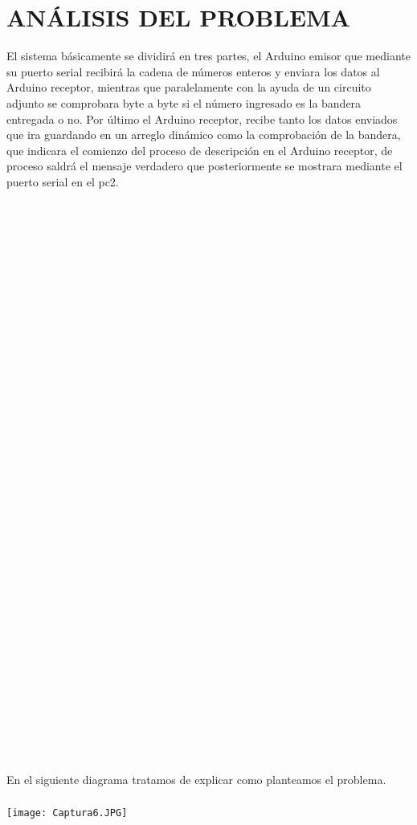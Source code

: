 \documentclass{article}
\begin{document}
\newpage
\section{ANÁLISIS DEL PROBLEMA}
\label{Análisis}

El sistema básicamente se dividirá en tres partes, el Arduino emisor que mediante su puerto serial recibirá la cadena de números enteros y enviara los datos al Arduino receptor, mientras que paralelamente con la ayuda de un circuito adjunto se comprobara byte a byte si el número ingresado es la bandera entregada o no. Por último el Arduino receptor, recibe tanto los datos enviados que ira guardando en un arreglo dinámico como la comprobación de la bandera, que indicara el comienzo del proceso de descripción en el Arduino receptor, de proceso saldrá el mensaje verdadero que posteriormente se mostrara mediante el puerto serial en el pc2.\\
\\
\\
\\
\\
\\
\\
\\
\\
\\
\\
\\
\\
\\
\\
\\
\\
\\
\\
\\
\\
\\
\\
\\
\\
\\
\\
\\
\\
\\
\\
\\
\\
\\
\\
\\
\\
\\
En el siguiente diagrama tratamos de explicar como planteamos el problema.\\
\\
\texttt{[image: Captura6.JPG]}\\
\end{document}
